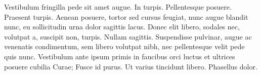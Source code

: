 Vestibulum fringilla pede sit amet augue. In turpis. Pellentesque posuere. Praesent turpis. Aenean posuere, tortor sed cursus feugiat, nunc augue blandit nunc, eu sollicitudin urna dolor sagittis lacus. Donec elit libero, sodales nec, volutpat a, suscipit non, turpis. Nullam sagittis. Suspendisse pulvinar, augue ac venenatis condimentum, sem libero volutpat nibh, nec pellentesque velit pede quis nunc. Vestibulum ante ipsum primis in faucibus orci luctus et ultrices posuere cubilia Curae; Fusce id purus. Ut varius tincidunt libero. Phasellus dolor.






